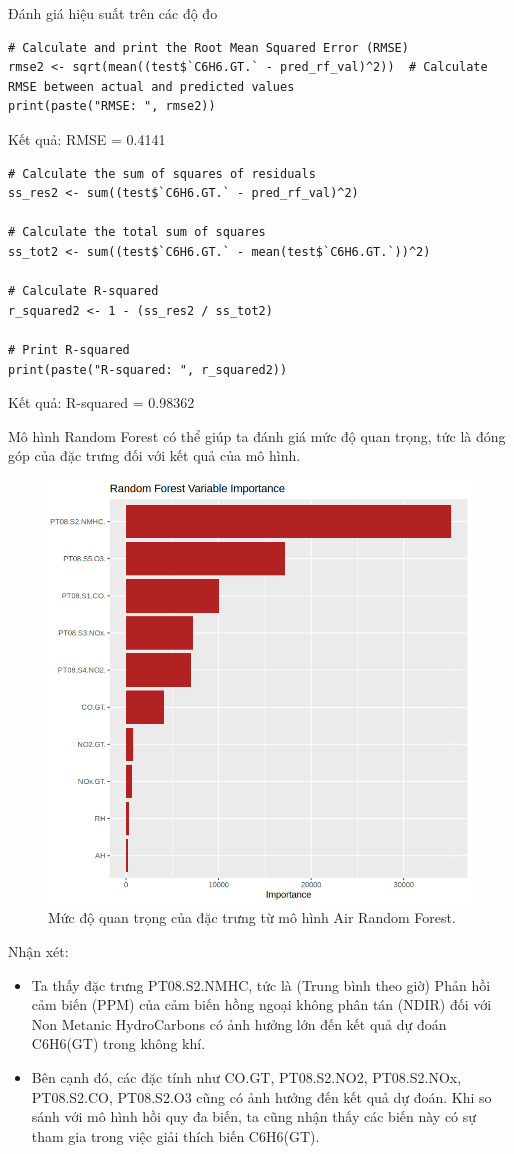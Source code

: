 Đánh giá hiệu suất trên các độ đo
\begin{lstlisting}
# Calculate and print the Root Mean Squared Error (RMSE)
rmse2 <- sqrt(mean((test$`C6H6.GT.` - pred_rf_val)^2))  # Calculate RMSE between actual and predicted values
print(paste("RMSE: ", rmse2)) 
\end{lstlisting}
Kết quả: RMSE = 0.4141

\begin{lstlisting}
# Calculate the sum of squares of residuals
ss_res2 <- sum((test$`C6H6.GT.` - pred_rf_val)^2)

# Calculate the total sum of squares
ss_tot2 <- sum((test$`C6H6.GT.` - mean(test$`C6H6.GT.`))^2)

# Calculate R-squared
r_squared2 <- 1 - (ss_res2 / ss_tot2)

# Print R-squared
print(paste("R-squared: ", r_squared2))
\end{lstlisting}

Kết quả: R-squared = 0.98362

Mô hình Random Forest có thể giúp ta đánh giá mức độ quan trọng, tức là đóng góp của đặc trưng đối với kết quả của mô hình. 
\begin{figure}[H]
    \centering
    \includegraphics[width=0.75\columnwidth]{air_figures/air_feature_importance.png}
    \caption{Mức độ quan trọng của đặc trưng từ mô hình Air Random Forest.}
    \label{fig:air_random_forest_feature_importance}
\end{figure}
Nhận xét:
\begin{itemize}
    \item Ta thấy đặc trưng PT08.S2.NMHC, tức là (Trung bình theo giờ) Phản hồi cảm biến (PPM) của cảm biến hồng ngoại không phân tán (NDIR) đối với Non Metanic HydroCarbons có ảnh hưởng lớn đến kết quả dự đoán C6H6(GT) trong không khí.
    \item Bên cạnh đó, các đặc tính như CO.GT, PT08.S2.NO2, PT08.S2.NOx, PT08.S2.CO, PT08.S2.O3 cũng có ảnh hưởng đến kết quả dự đoán. Khi so sánh với mô hình hồi quy đa biến, ta cũng nhận thấy các biến này có sự tham gia trong việc giải thích biến C6H6(GT).
\end{itemize}


